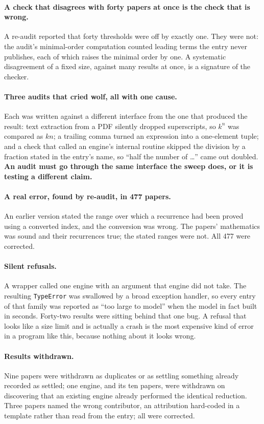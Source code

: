 \documentclass[11pt,a4paper]{article}
\theoremstyle{plain}
\theoremstyle{definition}
\begin{document}
\paragraph{A check that disagrees with forty papers at once is the check that is wrong.}
A re-audit reported that forty thresholds were off by exactly one. They were not: the audit's
minimal-order computation counted leading terms the entry never publishes, each of which raises
the minimal order by one. A systematic disagreement of a fixed size, against many results at
once, is a signature of the checker.

\paragraph{Three audits that cried wolf, all with one cause.}
Each was written against a different interface from the one that produced the result: text
extraction from a PDF silently dropped superscripts, so $k^n$ was compared as $kn$; a trailing
comma turned an expression into a one-element tuple; and a check that called an engine's
internal routine skipped the division by a fraction stated in the entry's name, so ``half the
number of \ldots'' came out doubled. \textbf{An audit must go through the same interface the
sweep does, or it is testing a different claim.}

\paragraph{A real error, found by re-audit, in 477 papers.}
An earlier version stated the range over which a recurrence had been proved using a converted
index, and the conversion was wrong. The papers' mathematics was sound and their recurrences
true; the stated ranges were not. All 477 were corrected.

\paragraph{Silent refusals.}
A wrapper called one engine with an argument that engine did not take. The resulting
\texttt{TypeError} was swallowed by a broad exception handler, so every entry of that family
was reported as ``too large to model'' when the model in fact built in seconds. Forty-two
results were sitting behind that one bug. A refusal that looks like a size limit and is
actually a crash is the most expensive kind of error in a program like this, because nothing
about it looks wrong.

\paragraph{Results withdrawn.}
Nine papers were withdrawn as duplicates or as settling something already recorded as settled;
one engine, and its ten papers, were withdrawn on discovering that an existing engine already
performed the identical reduction. Three papers named the wrong contributor, an attribution
hard-coded in a template rather than read from the entry; all were corrected.
\end{document}
